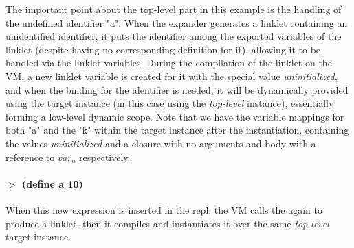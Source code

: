 The important point about the top-level part in this example is the
handling of the undefined identifier "a". When the expander generates
a linklet containing an unidentified identifier, it puts the
identifier among the exported variables of the linklet (despite having
no corresponding definition for it), allowing it to be handled via the
linklet variables. During the compilation of the linklet on the VM, a
new linklet variable is created for it with the special value
\emph{uninitialized}, and when the binding for the identifier is
needed, it will be dynamically provided using the target instance (in
this case using the \emph{top-level} instance), essentially forming a
low-level dynamic scope. Note that we have the variable mappings for
both "a" and the "k" within the target instance after the
instantiation, containing the values \emph{uninitialized} and a
closure with no arguments and body with a reference to $var_a$
respectively.

\paragraph{$>$ (define a 10)}

When this new expression is inserted in the repl, the VM calls the
 again to produce a linklet, then it compiles and
instantiates it over the same \emph{top-level} target instance.

\vspace{-0.5cm}

